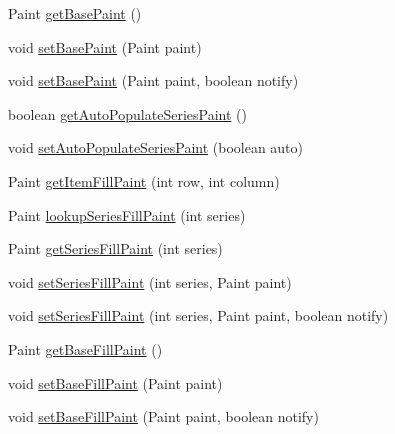 \begin{DoxyCompactItemize}
\item 
Paint \mbox{\hyperlink{classorg_1_1jfree_1_1chart_1_1renderer_1_1_abstract_renderer_a856d21345f9547c9ea9666db2c4928a2}{get\+Base\+Paint}} ()
\item 
void \mbox{\hyperlink{classorg_1_1jfree_1_1chart_1_1renderer_1_1_abstract_renderer_aa52fbb777d55d74a89d024d2a46dc794}{set\+Base\+Paint}} (Paint paint)
\item 
void \mbox{\hyperlink{classorg_1_1jfree_1_1chart_1_1renderer_1_1_abstract_renderer_acf4a3eec1a0e25b2e6d034fc3f0aaaf7}{set\+Base\+Paint}} (Paint paint, boolean notify)
\item 
boolean \mbox{\hyperlink{classorg_1_1jfree_1_1chart_1_1renderer_1_1_abstract_renderer_ad5056b1fd510436f90654a32c97dafd2}{get\+Auto\+Populate\+Series\+Paint}} ()
\item 
void \mbox{\hyperlink{classorg_1_1jfree_1_1chart_1_1renderer_1_1_abstract_renderer_a2ae58cd16b4f7c6f6b741bf47a5af5fb}{set\+Auto\+Populate\+Series\+Paint}} (boolean auto)
\item 
Paint \mbox{\hyperlink{classorg_1_1jfree_1_1chart_1_1renderer_1_1_abstract_renderer_ac9da36f02e26338f740ea54c9210e60f}{get\+Item\+Fill\+Paint}} (int row, int column)
\item 
Paint \mbox{\hyperlink{classorg_1_1jfree_1_1chart_1_1renderer_1_1_abstract_renderer_a12a702d7b43fac8d70b5c55c03b492fc}{lookup\+Series\+Fill\+Paint}} (int series)
\item 
Paint \mbox{\hyperlink{classorg_1_1jfree_1_1chart_1_1renderer_1_1_abstract_renderer_abe494da598ffcdb6526ff6d4342001ce}{get\+Series\+Fill\+Paint}} (int series)
\item 
void \mbox{\hyperlink{classorg_1_1jfree_1_1chart_1_1renderer_1_1_abstract_renderer_a58d6e005c9296bacaf29e2cfea8b58b7}{set\+Series\+Fill\+Paint}} (int series, Paint paint)
\item 
void \mbox{\hyperlink{classorg_1_1jfree_1_1chart_1_1renderer_1_1_abstract_renderer_a0b638e18e4eeebd6c13616cdd2489b6e}{set\+Series\+Fill\+Paint}} (int series, Paint paint, boolean notify)
\item 
Paint \mbox{\hyperlink{classorg_1_1jfree_1_1chart_1_1renderer_1_1_abstract_renderer_a2a4e95f2a4c788c700bf5f14eff1ad01}{get\+Base\+Fill\+Paint}} ()
\item 
void \mbox{\hyperlink{classorg_1_1jfree_1_1chart_1_1renderer_1_1_abstract_renderer_adc85155c19775ca3f04043f15e060811}{set\+Base\+Fill\+Paint}} (Paint paint)
\item 
void \mbox{\hyperlink{classorg_1_1jfree_1_1chart_1_1renderer_1_1_abstract_renderer_a4459e5fa0bd6b01b1c7ba2083c1aa6f4}{set\+Base\+Fill\+Paint}} (Paint paint, boolean notify)

\end{DoxyCompactItemize}
